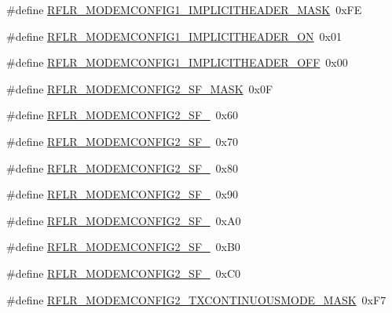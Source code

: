 \begin{DoxyCompactItemize}
\item 
\#define \mbox{\hyperlink{sx1276_regs-_lo_ra_8h_a5c3e8f169b7fd6a7c8c064f00aca22b5}{R\+F\+L\+R\+\_\+\+M\+O\+D\+E\+M\+C\+O\+N\+F\+I\+G1\+\_\+\+I\+M\+P\+L\+I\+C\+I\+T\+H\+E\+A\+D\+E\+R\+\_\+\+M\+A\+SK}}~0x\+FE
\item 
\#define \mbox{\hyperlink{sx1276_regs-_lo_ra_8h_abebb6a657cfb5c28ed1e40efaf65d41b}{R\+F\+L\+R\+\_\+\+M\+O\+D\+E\+M\+C\+O\+N\+F\+I\+G1\+\_\+\+I\+M\+P\+L\+I\+C\+I\+T\+H\+E\+A\+D\+E\+R\+\_\+\+ON}}~0x01
\item 
\#define \mbox{\hyperlink{sx1276_regs-_lo_ra_8h_ab556742d1ecaced47aa63acbb5f52500}{R\+F\+L\+R\+\_\+\+M\+O\+D\+E\+M\+C\+O\+N\+F\+I\+G1\+\_\+\+I\+M\+P\+L\+I\+C\+I\+T\+H\+E\+A\+D\+E\+R\+\_\+\+O\+FF}}~0x00
\item 
\#define \mbox{\hyperlink{sx1276_regs-_lo_ra_8h_ac76e1fabdc6072d4f6110c17b1b6d34d}{R\+F\+L\+R\+\_\+\+M\+O\+D\+E\+M\+C\+O\+N\+F\+I\+G2\+\_\+\+S\+F\+\_\+\+M\+A\+SK}}~0x0F
\item 
\#define \mbox{\hyperlink{sx1276_regs-_lo_ra_8h_a79aea3587de0d6b3d509ffb74c68cf52}{R\+F\+L\+R\+\_\+\+M\+O\+D\+E\+M\+C\+O\+N\+F\+I\+G2\+\_\+\+S\+F\+\_}}~0x60
\item 
\#define \mbox{\hyperlink{sx1276_regs-_lo_ra_8h_acc46f8d414149e44dd110e4839277386}{R\+F\+L\+R\+\_\+\+M\+O\+D\+E\+M\+C\+O\+N\+F\+I\+G2\+\_\+\+S\+F\+\_}}~0x70
\item 
\#define \mbox{\hyperlink{sx1276_regs-_lo_ra_8h_a68793443cf8e71888053c9b20b1e39b5}{R\+F\+L\+R\+\_\+\+M\+O\+D\+E\+M\+C\+O\+N\+F\+I\+G2\+\_\+\+S\+F\+\_}}~0x80
\item 
\#define \mbox{\hyperlink{sx1276_regs-_lo_ra_8h_aa08790a707957dd4af566cb0c8d85299}{R\+F\+L\+R\+\_\+\+M\+O\+D\+E\+M\+C\+O\+N\+F\+I\+G2\+\_\+\+S\+F\+\_}}~0x90
\item 
\#define \mbox{\hyperlink{sx1276_regs-_lo_ra_8h_ad13461cea4b7c46dcb9043766b435ccf}{R\+F\+L\+R\+\_\+\+M\+O\+D\+E\+M\+C\+O\+N\+F\+I\+G2\+\_\+\+S\+F\+\_}}~0x\+A0
\item 
\#define \mbox{\hyperlink{sx1276_regs-_lo_ra_8h_a10a0b7d83cf516794592fe46263ebfb8}{R\+F\+L\+R\+\_\+\+M\+O\+D\+E\+M\+C\+O\+N\+F\+I\+G2\+\_\+\+S\+F\+\_}}~0x\+B0
\item 
\#define \mbox{\hyperlink{sx1276_regs-_lo_ra_8h_ab5d322da73b14a285604eb9d9cee496f}{R\+F\+L\+R\+\_\+\+M\+O\+D\+E\+M\+C\+O\+N\+F\+I\+G2\+\_\+\+S\+F\+\_}}~0x\+C0
\item 
\#define \mbox{\hyperlink{sx1276_regs-_lo_ra_8h_a56711c409baa81b02691cbdd892d99da}{R\+F\+L\+R\+\_\+\+M\+O\+D\+E\+M\+C\+O\+N\+F\+I\+G2\+\_\+\+T\+X\+C\+O\+N\+T\+I\+N\+U\+O\+U\+S\+M\+O\+D\+E\+\_\+\+M\+A\+SK}}~0x\+F7

\end{DoxyCompactItemize}
